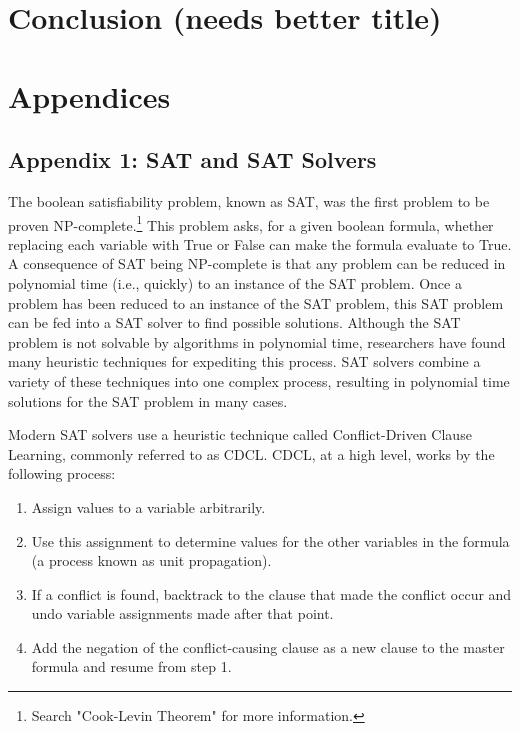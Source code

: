 \documentclass[jou,apacite]{apa6}
\begin{document}
\section{Conclusion (needs better title)}

\section{Appendices}

\subsection{Appendix 1: SAT and SAT Solvers}

The boolean satisfiability problem, known as SAT, was the first problem to be proven NP-complete.\footnote{Search "Cook-Levin Theorem" for more information.} This problem asks, for a given boolean formula, whether replacing each variable with True or False can make the formula evaluate to True.   A consequence of SAT being NP-complete is that any problem can be reduced in polynomial time (i.e., quickly) to an instance of the SAT problem. Once a problem has been reduced to an instance of the SAT problem, this SAT problem can be fed into a SAT solver to find possible solutions. Although the SAT problem is not solvable by algorithms in polynomial time, researchers have found many heuristic techniques for expediting this process. SAT solvers combine a variety of these techniques into one complex process, resulting in polynomial time solutions for the SAT problem in many cases.

Modern SAT solvers use a heuristic technique called Conflict-Driven Clause Learning, commonly referred to as CDCL. CDCL, at a high level, works by the following process:

\begin{enumerate}

\item Assign values to a variable arbitrarily.
\item Use this assignment to determine values for the other variables in the formula (a process known as unit propagation).
\item If a conflict is found, backtrack to the clause that made the conflict occur and undo variable assignments made after that point.
\item Add the negation of the conflict-causing clause as a new clause to the master formula and resume from step 1.

\end{enumerate}
\end{document}
